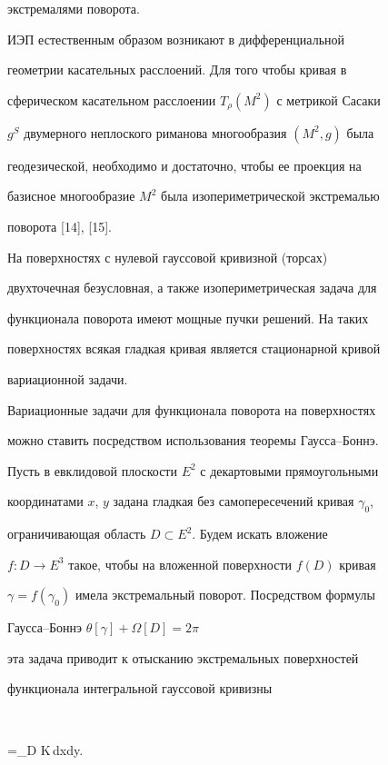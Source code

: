 экстремалями поворота. 


 


ИЭП естественным образом возникают в дифференциальной 


геометрии касательных расслоений. Для того чтобы кривая в 


сферическом касательном расслоении $T_\rho(M^2)$ с метрикой Сасаки 


$g^S$ двумерного неплоского риманова многообразия $(M^2,g)$ была 


геодезической, необходимо и достаточно, чтобы ее проекция на 


базисное многообразие $M^2$ была изопериметрической экстремалью 


поворота [14], [15]. 


 


На поверхностях с нулевой гауссовой кривизной (торсах) 


двухточечная безусловная, а также изопериметрическая задача для 


функционала поворота имеют мощные пучки решений. На таких 


поверхностях всякая гладкая кривая является стационарной кривой 


вариационной задачи. 


 


Вариационные задачи для функционала поворота на поверхностях 


можно ставить посредством использования теоремы Гаусса--Боннэ. 


Пусть в евклидовой плоскости $E^2$ с декартовыми прямоугольными 


координатами $x$, $y$ задана гладкая без самопересечений кривая $\gamma_0$, 


ограничивающая область $D\subset E^2$. Будем искать вложение 


$f:D\to E^3$ такое, чтобы на вложенной поверхности $f(D)$ кривая 


$\gamma=f(\gamma_0)$ имела экстремальный поворот. Посредством формулы 


Гаусса--Боннэ $\theta[\gamma]+\Omega[D]=2\pi$ 


эта задача приводит к отысканию экстремальных поверхностей 


функционала интегральной гауссовой кривизны 


$$ 


\Omega[f]=\iint\limits_D K\,dx\wedge dy. 



